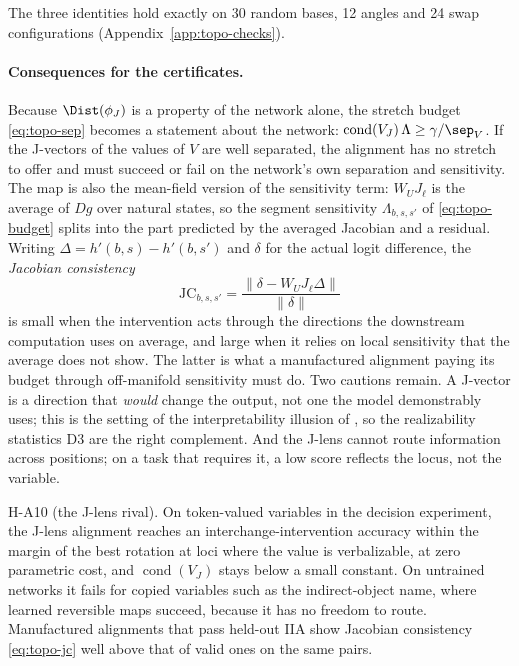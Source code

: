 \LNum{} The three identities hold exactly on 30 random bases, 12 angles
and 24 swap configurations (Appendix~\ref{app:topo-checks}).

\paragraph{Consequences for the certificates.} \LCalc{} Because
$\Dist(\phi_J)$ is a property of the network alone, the stretch budget
\eqref{eq:topo-sep} becomes a statement about the network:
$\operatorname{cond}(V_J)\,\Lambda\ge\gamma/\sep_V$. If the J-vectors of the
values of $V$ are well separated, the alignment has no stretch to offer and
must succeed or fail on the network's own separation and sensitivity. The
map is also the mean-field version of the sensitivity term: $W_UJ_\ell$ is
the average of $Dg$ over natural states, so the segment sensitivity
$\Lambda_{b,s,s'}$ of \eqref{eq:topo-budget} splits into the part predicted
by the averaged Jacobian and a residual. Writing $\Delta=h'(b,s)-h'(b,s')$
and $\delta$ for the actual logit difference, the \emph{Jacobian
consistency}
\begin{equation}
\mathrm{JC}_{b,s,s'}=\frac{\|\delta-W_UJ_\ell\Delta\|}{\|\delta\|}
\label{eq:topo-jc}
\end{equation}
is small when the intervention acts through the directions the downstream
computation uses on average, and large when it relies on local sensitivity
that the average does not show. The latter is what a manufactured alignment
paying its budget through off-manifold sensitivity must do. Two cautions
remain. A J-vector is a direction that \emph{would} change the output, not
one the model demonstrably uses; this is the setting of the interpretability
illusion of \cite{makelov2024}, so the realizability statistics D3 are the
right complement. And the J-lens cannot route information across positions;
on a task that requires it, a low score reflects the locus, not the
variable.

\begin{hypbox}{H-A10 (the J-lens rival).}
On token-valued variables in the decision experiment, the J-lens alignment
reaches an interchange-intervention accuracy within the margin of the best
rotation at loci where the value is verbalizable, at zero parametric cost,
and $\operatorname{cond}(V_J)$ stays below a small constant. On untrained
networks it fails for copied variables such as the indirect-object name,
where learned reversible maps succeed, because it has no freedom to route.
Manufactured alignments that pass held-out IIA show Jacobian consistency
\eqref{eq:topo-jc} well above that of valid ones on the same pairs.
\end{hypbox}

